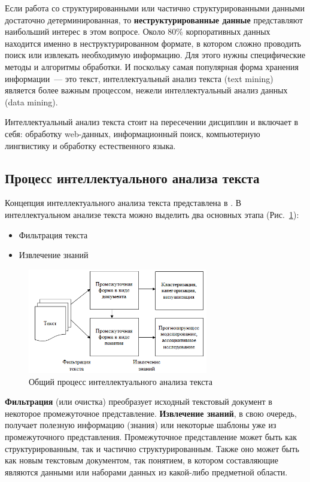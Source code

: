 \documentclass[14pt]{matmex-diploma-custom}
\begin{document}
Если работа со структурированными или частично структурированными данными достаточно детерминированная, то \textbf{неструктурированные данные} представляют наибольший интерес в этом вопросе. Около 80\% корпоративных данных находится именно в неструктурированном формате, в котором сложно проводить поиск или извлекать необходимую информацию. Для этого нужны специфические методы и алгоритмы обработки. И поскольку самая популярная форма хранения информации~--- это текст, интеллектуальный анализ текста (text mining) является более важным процессом, нежели интеллектуальный анализ данных (data mining).

Интеллектуальный анализ текста стоит на пересечении дисциплин и включает в себя: обработку web-данных, информационный поиск, компьютерную лингвистику и обработку естественного языка.

\subsection{Процесс интеллектуального анализа текста}

Концепция интеллектуального анализа текста представлена в \cite{article:text_mining}. В интеллектуальном анализе текста можно выделить два основных этапа (Рис.~\ref{img:text_mining}):

\begin{itemize}
\item Фильтрация текста
\item Извлечение знаний
\end{itemize}

\begin{figure}[h]
\centering
\includegraphics[width=0.7\textwidth]{img/text_mining}
\caption{Общий процесс интеллектуального анализа текста}
\label{img:text_mining}
\end{figure}

\textbf{Фильтрация} (или очистка) преобразует исходный текстовый документ в некоторое промежуточное представление. \textbf{Извлечение знаний}, в свою очередь, получает полезную информацию (знания) или некоторые шаблоны уже из промежуточного представления. Промежуточное представление может быть как структурированным, так и частично структурированным. Также оно может быть как новым текстовым документом, так понятием, в котором составляющие являются данными или наборами данных из какой-либо предметной области.
\end{document}
